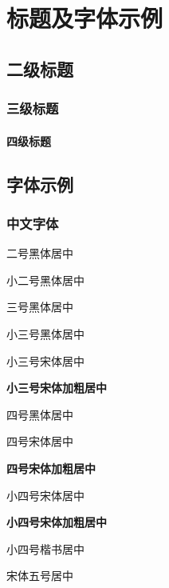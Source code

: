 \chapter{标题及字体示例}

\section{二级标题}

\subsection{三级标题}

\subsubsection{四级标题}

\section{字体示例}

\subsection{中文字体}

\begin{center}

    {\heiti 二号黑体居中}

    {\heiti 小二号黑体居中}

    {\heiti 三号黑体居中}

    {
        {\heiti 小三号黑体居中}

        {\songti 小三号宋体居中}

        {\bfseries\songti 小三号宋体加粗居中}
    }

    {
        {\heiti 四号黑体居中}

        {\songti 四号宋体居中}

        {\bfseries\songti 四号宋体加粗居中}
    }
    
    {
        {\songti 小四号宋体居中}

        {\bfseries\songti 小四号宋体加粗居中}

        {\kaishu 小四号楷书居中}

    }

    {\songti{} 宋体五号居中}

\end{center}

